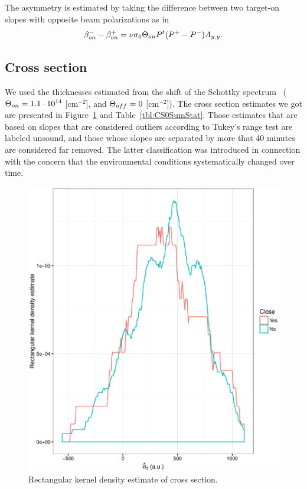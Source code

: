 \documentclass{report}
\begin{document}
The asymmetry is estimated by taking the difference between two target-on slopes with opposite beam polarizations as in
\[
	\slp[on]^- - \slp[on]^+ = \nu\CS[0]\Thick[on] P^t\DP*\Ayy.
\]
\subsection{Cross section}
We used the thicknesses estimated from the shift of the Schottky spectrum~\cite{Stein} ($\Thick[on] = \vp{1.1}{14}$ [cm$^{-2}$], and $\Thick[off] = 0$ [cm$^{-2}$]). The cross section estimates we got are presented in Figure~\ref{fig:CS0au_dens} and Table~\ref{tbl:CS0SumStat}. Those estimates that are based on slopes that are considered outliers according to Tukey's range test are labeled unsound, and those whose slopes are separated by more that 40 minutes are considered far removed. The latter classification was introduced in connection with the concern that the environmental conditions systematically changed over time.

\begin{figure}[H]
	\centering
	\includegraphics{CS0_au_dens.eps}
	\caption{Rectangular kernel density estimate of cross section.\label{fig:CS0au_dens}}
\end{figure}
\end{document}
